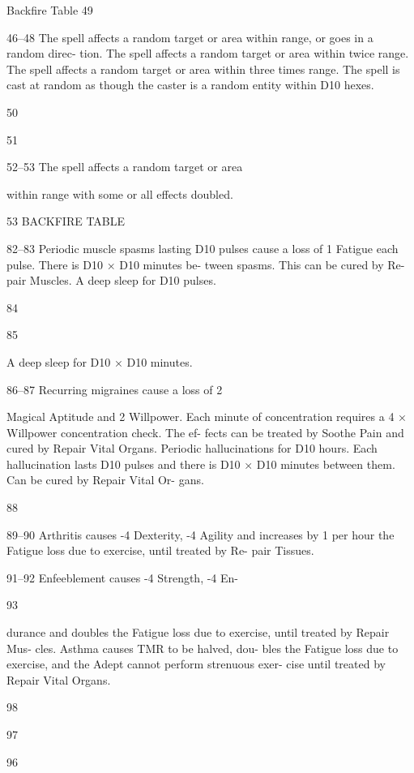 \begin{Chapter}{Backfire Table}
49  

46–48   The spell affects a random target or area 
within range, or goes in a random direc-
tion. 
The spell affects a random target or area 
within twice range. 
The spell affects a random target or area 
within three times range. 
The spell is cast at random as though the 
caster is a random entity within D10 
hexes. 

50  

51  

52–53   The spell affects a random target or area 

within range with some or all effects 
doubled. 

53 BACKFIRE TABLE 

82–83   Periodic muscle spasms lasting D10 
pulses cause a loss of 1 Fatigue each 
pulse. There is D10 × D10 minutes be-
tween spasms. This can be cured by Re-
pair Muscles. 
A deep sleep for D10 pulses. 

84  

85  

A deep sleep for D10 × D10 minutes. 

86–87   Recurring migraines cause a loss of 2 

Magical Aptitude and 2 Willpower. Each 
minute of concentration requires a 4 × 
Willpower concentration check. The ef-
fects can be treated by Soothe Pain and 
cured by Repair Vital Organs. 
Periodic hallucinations for D10 hours. 
Each hallucination lasts D10 pulses and 
there is D10 × D10 minutes between 
them. Can be cured by Repair Vital Or-
gans. 

88  

89–90   Arthritis causes -4 Dexterity, -4 Agility 
and increases by 1 per hour the Fatigue 
loss due to exercise, until treated by Re-
pair Tissues. 

91–92   Enfeeblement causes -4 Strength, -4 En-

93  

durance and doubles the Fatigue loss due 
to exercise, until treated by Repair Mus-
cles. 
Asthma causes TMR to be halved, dou-
bles the Fatigue loss due to exercise, and 
the Adept cannot perform strenuous exer-
cise until treated by Repair Vital Organs. 

98  

97  

96  


\end{Chapter}

